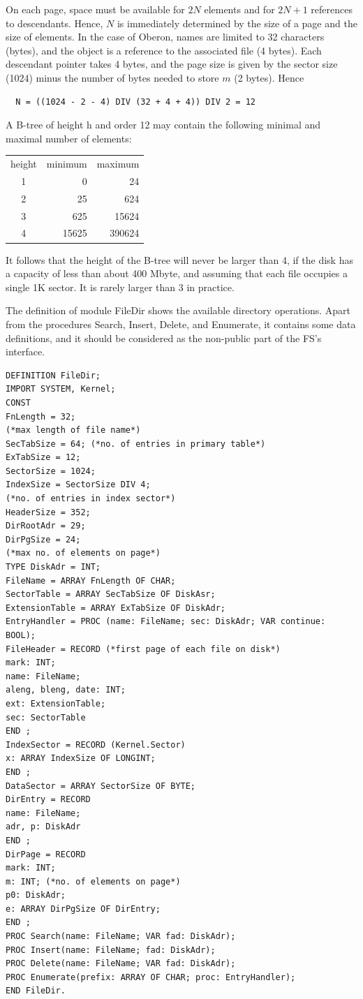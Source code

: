 On each page, space must be available for $2N$ elements and for $2N + 1$ references to
descendants. Hence, $N$ is immediately determined by the size of a page and the size of elements.
In the case of Oberon, names are limited to 32 characters (bytes), and the object is a
reference to the associated file (4 bytes). Each descendant pointer takes 4 bytes, and the page
size is given by the sector size (1024) minus the number of bytes needed to store $m$ (2 bytes).
Hence
\begin{verbatim}
  N = ((1024 - 2 - 4) DIV (32 + 4 + 4)) DIV 2 = 12
\end{verbatim}
A B-tree of height h and order 12 may contain the following minimal and maximal number of
elements:
\begin{table}
	\centering
	\begin{tabular}{c r r}
		height & minimum & maximum \\
		1      &       0 &      24 \\
		2      &      25 &     624 \\
		3      &     625 &   15624 \\
		4      &   15625 &  390624 \\
	\end{tabular}
\end{table}

It follows that the height of the B-tree will never be larger than 4, if the disk has a capacity of less
than about 400 Mbyte, and assuming that each file occupies a single 1K sector. It is rarely larger
than 3 in practice.

The definition of module FileDir shows the available directory operations. Apart from the
procedures Search, Insert, Delete, and Enumerate, it contains some data definitions, and it
should be considered as the non-public part of the FS's interface.
\begin{verbatim}
DEFINITION FileDir;
IMPORT SYSTEM, Kernel;
CONST
FnLength = 32;
(*max length of file name*)
SecTabSize = 64; (*no. of entries in primary table*)
ExTabSize = 12;
SectorSize = 1024;
IndexSize = SectorSize DIV 4;
(*no. of entries in index sector*)
HeaderSize = 352;
DirRootAdr = 29;
DirPgSize = 24;
(*max no. of elements on page*)
TYPE DiskAdr = INT;
FileName = ARRAY FnLength OF CHAR;
SectorTable = ARRAY SecTabSize OF DiskAsr;
ExtensionTable = ARRAY ExTabSize OF DiskAdr;
EntryHandler = PROC (name: FileName; sec: DiskAdr; VAR continue: BOOL);
FileHeader = RECORD (*first page of each file on disk*)
mark: INT;
name: FileName;
aleng, bleng, date: INT;
ext: ExtensionTable;
sec: SectorTable
END ;
IndexSector = RECORD (Kernel.Sector)
x: ARRAY IndexSize OF LONGINT;
END ;
DataSector = ARRAY SectorSize OF BYTE;
DirEntry = RECORD
name: FileName;
adr, p: DiskAdr
END ;
DirPage = RECORD
mark: INT;
m: INT; (*no. of elements on page*)
p0: DiskAdr;
e: ARRAY DirPgSize OF DirEntry;
END ;
PROC Search(name: FileName; VAR fad: DiskAdr);
PROC Insert(name: FileName; fad: DiskAdr);
PROC Delete(name: FileName; VAR fad: DiskAdr);
PROC Enumerate(prefix: ARRAY OF CHAR; proc: EntryHandler);
END FileDir.
\end{verbatim}

